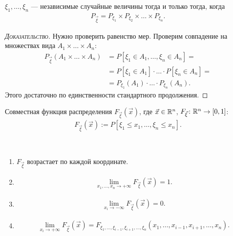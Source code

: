 \begin{thm}
 $ \xi_1, \ldots, \xi_n $ --- независимые случайные величины тогда и только тогда, когда
 \begin{align*}
  P_{\vec\xi} = P_{\xi_1} \times P_{\xi_2} \times \ldots \times P_{\xi_n}.
 \end{align*} 
\end{thm}
\begin{proof}[\normalfont\textsc{Доказательство}]
 Нужно проверить равенство мер. Проверим совпадение на множествах вида $ A_1 \times \ldots \times A_n $:
 \begin{align*}
  P_{\vec\xi}(A_1 \times \ldots \times A_n) &= P[\xi_1 \in A_1, \ldots, \xi_n \in A_n] =  \\
  &= P[\xi_1 \in A_1] \cdot \ldots \cdot P[\xi_n \in A_n] = \\
  &= P_{\xi_1}(A_1) \cdot \ldots \cdot P_{\xi_n}(A_n).
 \end{align*} Этого достаточно по единственности стандартного продолжения.
\end{proof}

\begin{df}
 Совместная функция распределения $ F_{\vec\xi}(\vec x) $, где $ \vec x \in \mathbb{R}^{n} $, $ F_{\vec\xi} \colon \mathbb{R}^{n} \to [0,1] $:
 \begin{align*}
  F_{\vec\xi}(\vec x) := P[\xi_1 \leqslant x_1, \ldots, \xi_n \leqslant x_n].
 \end{align*} 
\end{df}

\begin{prop}\
 \begin{enumerate}
  \item $ F_{\vec\xi} $ возрастает по каждой координате.
  \item \begin{align*}
    \lim_{x_1, \ldots, x_n \to +\infty}  F_{\vec\xi}(\vec x) = 1.
  \end{align*} 
 \item \begin{align*}
   \lim_{x_i \to -\infty} F_{\vec\xi}(\vec x) = 0.
 \end{align*} 
\item \begin{align*}
  \lim_{x_i \to +\infty} F_{\vec\xi}(\vec x) = F_{\xi_1, \ldots, \xi_{i-1}, \xi_{i+1}, \ldots, \xi_n}(x_1, \ldots, x_{i-1},x_{i+1},\ldots,x_n).
\end{align*} 
 \end{enumerate}
\end{prop}

